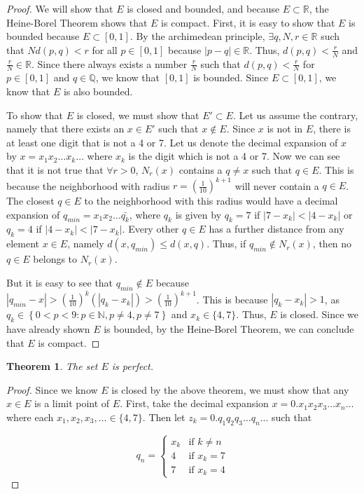 \documentclass[psamsfonts]{amsart}
\newtheorem{thm}{Theorem}[section]
\theoremstyle{definition}
\theoremstyle{remark}
\numberwithin{equation}{section}
\begin{document}
\begin{proof}
We will show that $E$ is closed and bounded, and because $E \subset \mathbb{R}$, the Heine-Borel Theorem shows that $E$ is compact. First, it is easy to show that $E$ is bounded because $E \subset [0,1]$. By the archimedean principle, $\exists q,N,r \in \mathbb{R}$ such that $N d(p,q) < r$ for all $p \in [0,1]$ because $|p-q| \in \mathbb{R}$. Thus, $d(p,q) < \frac{r}{N}$ and $\frac{r}{N} \in \mathbb{R}$. Since there always exists a number $\frac{r}{N}$ such that $d(p,q) < \frac{r}{N}$ for $p \in [0,1]$ and $q \in \mathbb{Q}$, we know that $[0,1]$ is bounded. Since $E \subset [0,1]$, we know that $E$ is also bounded.

To show that $E$ is closed, we must show that $E' \subset E$. Let us assume the contrary, namely that there exists an $x \in E'$ such that $x \notin E$. Since $x$ is not in $E$, there is at least one digit that is not a 4 or 7. Let us denote the decimal expansion of $x$ by $ x = x_1 x_2 \ldots x_k \ldots$ where $x_k$ is the digit which is not a 4 or 7. Now we can see that it is not true that $\forall r>0$, $N_r(x)$ contains a $q \neq x$ such that $q \in E$. This is because the neighborhood with radius $r = \left(\frac{1}{10} \right)^{k+1}$ will never contain a $q \in E$. The closest $q \in E$ to the neighborhood with this radius would have a decimal expansion of $ q_{min} = x_1 x_2 \ldots \bar{q_k}$, where $q_k$ is given by $q_k = 7$ if $|7-x_k|< |4-x_k|$ or $q_k = 4$ if $|4-x_k| < |7-x_k|$. Every other $q \in E$ has a further distance from any element $x \in E$, namely $d(x,q_{min}) \leq d(x,q)$. Thus, if $q_{min} \notin N_r(x)$, then no $q \in E$ belongs to $N_r(x)$. 

But it is easy to see that $q_{min} \notin E$ because $ |q_{min} - x| > \left(\frac{1}{10}\right)^{k} ( |q_k - x_k|) > \left( \frac{1}{10} \right)^{k+1}$. This is because $|q_k - x_k| > 1$, as $q_k \in \left\{ 0<p<9: p \in \mathbb{N}, p \neq 4, p \neq 7 \right\} $ and $x_k \in \{4,7\}$. Thus, $E$ is closed. Since we have already shown $E$ is bounded, by the Heine-Borel Theorem, we can conclude that $E$ is compact.
\end{proof}

\begin{thm}
The set $E$ is perfect.
\end{thm}

\begin{proof}
Since we know $E$ is closed by the above theorem, we must show that any $x \in E$ is a limit point of $E$. First, take the decimal expansion $x = 0.x_1 x_2 x_3 \ldots x_n \ldots$ where each $x_1,x_2,x_3, \ldots \in \{4,7\}$. Then let $z_k = 0. q_1 q_2 q_3 \ldots q_n \ldots$ such that

\begin{displaymath}
q_n = \left\{
\begin{array}{ll}
x_k&\text{if } k \neq n \\
4 & \text{if } x_k = 7 \\
7 & \text{if } x_k = 4
\end{array}
\right.
\end{displaymath}
\end{proof}
\end{document}
